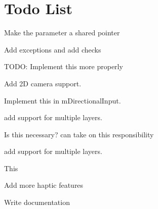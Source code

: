 \chapter{Todo List}
\hypertarget{todo}{}\label{todo}

\begin{DoxyRefList}
\item[Member \doxylink{class_atlas_1_1_component_a995c7391052db9cd22716846e0735b71}{Atlas\+::Component\+::set\+Owner} (\doxylink{class_atlas_1_1_i_game_object}{IGame\+Object} \texorpdfstring{$\ast$}{*}owner)]\label{todo__todo000004}%
%
Make the parameter a shared pointer 



Add exceptions and add checks  
\item[Member \doxylink{namespace_atlas_a2fb14e6c76bf6e577bdd65ffff7d7519}{Atlas\+::Default\+Physics\+Trace} (const char \texorpdfstring{$\ast$}{*}in\+FMT,...)]\label{todo__todo000012}%
%
TODO\+: Implement this more properly  
\item[Class \doxylink{class_atlas_1_1_game_camera}{Atlas\+::Game\+Camera} ]\label{todo__todo000014}%
%
Add 2D camera support.  
\item[Class \doxylink{class_atlas_1_1_game_camera_1_1_directional_input}{Atlas\+::Game\+Camera\+::Directional\+Input} ]\label{todo__todo000015}%
%
Implement this in m\+Directional\+Input.  
\item[Class \doxylink{class_atlas_1_1_i_game_object}{Atlas\+::IGame\+Object} ]\label{todo__todo000009}%
%
add support for multiple layers.  
\item[Member \doxylink{class_atlas_1_1_i_game_object_aadb8ac4a4ee34905fb156c41929f24f6}{Atlas\+::IGame\+Object\+::cleanup} ()=0]\label{todo__todo000011}%
%
Is this necessary?  can take on this responsibility  
\item[Member \doxylink{class_atlas_1_1_i_game_object_a0001128436e3b2402a682785f7fd8463}{Atlas\+::IGame\+Object\+::depth} ]\label{todo__todo000010}%
%
add support for multiple layers.  
\item[Class \doxylink{class_atlas_1_1_localization_registry}{Atlas\+::Localization\+Registry} ]\label{todo__todo000008}%
%
This  
\item[File \doxylink{_common_8h}{Common.h} ]\label{todo__todo000001}%
%
Add more haptic features 
\item[File \doxylink{_file_system_registry_8h}{File\+System\+Registry.h} ]\label{todo__todo000005}%
%
Write documentation 




\end{DoxyRefList}
